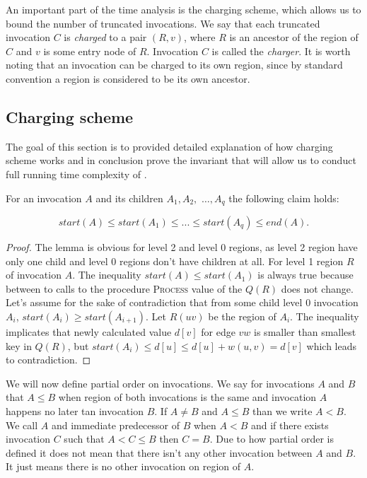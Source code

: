 An important part of the time analysis is the charging scheme, which allows us to bound the number of truncated invocations. We say that each truncated invocation $C$ is \emph{charged} to a pair $(R, v)$, where $R$ is an ancestor of the region of $C$ and $v$ is some entry node of $R$. Invocation $C$ is called the \emph{charger}. It is worth noting that an invocation can be charged to its own region, since by standard convention a region is considered to be its own ancestor.


\subsection{Charging scheme}

The goal of this section is to provided detailed explanation of how charging scheme works and in conclusion prove the invariant that will allow us to conduct full running time complexity of .

\begin{lemma} 
\label{startLemma}
For an invocation $A$ and its children $A_1, A_2,$ $\ldots, A_q$ the following claim holds:

$$start(A) \leq start(A_1) \leq ... \leq start(A_q) \leq end(A).$$

\end{lemma}

\begin{proof}
The lemma is obvious for level 2 and level 0 regions, as level 2 region have only one child and level 0 regions don't have children at all. For level 1 region $R$ of invocation $A$. The inequality $start(A) \leq start(A_1)$ is always true because between to calls to the procedure \textsc{Process} value of the $Q(R)$ does not change.   
Let's assume for the sake of contradiction that from some child level 0 invocation $A_i$, $start(A_i) \geq start(A_{i+1})$. Let $R(u v)$ be the region of $A_i$. The inequality implicates that newly calculated value $d[v]$ for edge $v w$ is smaller than smallest key in $Q(R)$, but $start(A_i) \leq d[u] \leq d[u] + w(u, v) = d[v]$ which leads to contradiction.
\end{proof}

We will now define partial order on invocations. We say for invocations $A$ and $B$ that $A \leq B$ when region of both invocations is the same and invocation $A$ happens no later tan invocation $B$. If $A \neq B$ and $A \leq B$ than we write $A < B$. We call $A$ and immediate predecessor of $B$ when $A < B$ and if there exists invocation $C$ such that $A < C \leq B$ then $C = B$. Due to how partial order is defined it does not mean that there isn't any other invocation between $A$ and $B$. It just means there is no other invocation on region of $A$.

